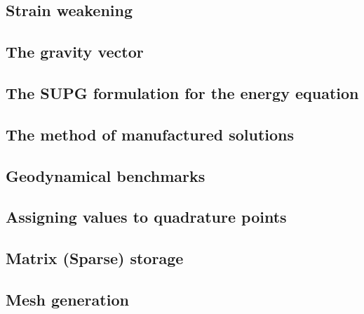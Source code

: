 \documentclass[a4paper]{article}
\begin{document}
\subsection{Strain weakening} \label{sec:strainweakening}  %
\newpage %
\subsection{The gravity vector} \label{sec:gravityvector}  %
\newpage %
\subsection{The SUPG formulation for the energy equation} \label{sec:supg}  %
\newpage %
\subsection{The method of manufactured solutions \label{mms}}  %
\newpage %
\subsection{Geodynamical benchmarks}  %
\newpage %
\subsection{Assigning values to quadrature points}  %
\newpage %
\subsection{Matrix (Sparse) storage}  %
\newpage %
\subsection{Mesh generation} \label{sec:meshes}  %
\newpage %
\end{document}
